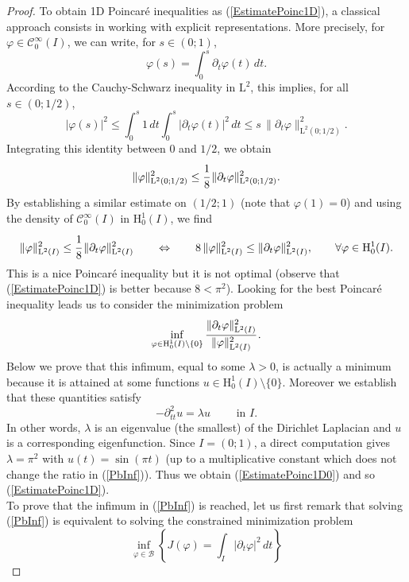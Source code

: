 \documentclass[11pt,a4paper]{report}
\newcommand{\mrm}[1]{\mathrm{#1}}
\newcommand{\mL}{\mrm{L}}
\newcommand{\mH}{\mrm{H}}
\begin{document}
\begin{proof}
To obtain 1D Poincar\'e inequalities as (\ref{EstimatePoinc1D}), a classical approach consists in working with explicit representations. More precisely, for $\varphi\in\mathscr{C}^\infty_0(I)$, we can write, for $s\in(0;1)$,
\[
\varphi(s)=\int_{0}^s \partial_t\varphi(t)\,dt.
\]
According to the Cauchy-Schwarz inequality in $\mL^2$, this implies, for all $s\in(0;1/2)$,
\[
|\varphi(s)|^2 \le \int_{0}^s1\,dt\int_{0}^s|\partial_t\varphi(t)|^2\,dt \le s\,\|\partial_t\varphi\|^2_{\mL^2(0;1/2)}.
\]
Integrating this identity between $0$ and $1/2$, we obtain
\[
\|\varphi\|^2_{\mL^2(0;1/2)}\le \cfrac{1}{8}\,\|\partial_t\varphi\|^2_{\mL^2(0;1/2)}.
\]
By establishing a similar estimate on $(1/2;1)$ (note that $\varphi(1)=0$) and using the density of $\mathscr{C}^\infty_0(I)$ in $\mH^1_0(I)$, we find 
\[
\|\varphi\|^2_{\mL^2(I)}\le \cfrac{1}{8}\,\|\partial_t\varphi\|^2_{\mL^2(I)}\qquad\Leftrightarrow\qquad 8\,\|\varphi\|^2_{\mL^2(I)}\le \|\partial_t\varphi\|^2_{\mL^2(I)},\qquad\forall\varphi\in\mH^1_0(I).
\]
This is a nice Poincar\'e inequality but it is not optimal (observe that (\ref{EstimatePoinc1D}) is better because $8<\pi^2$). Looking for the best Poincar\'e inequality leads us to consider the minimization problem 
\begin{equation}\label{PbInf}
\inf_{\varphi\in\mH^1_0(I)\setminus\{0\}} \cfrac{\|\partial_t\varphi\|^2_{\mL^2(I)}}{\|\varphi\|^2_{\mL^2(I)}}\,.
\end{equation}
Below we prove that this infimum, equal to some $\lambda>0$, is actually a minimum because it is attained at some functions $u\in\mH^1_0(I)\setminus\{0\}$. Moreover we establish that these quantities  satisfy
\begin{equation}\label{PbSpectral}
-\partial_{tt}^2u=\lambda u\qquad\mbox{ in }I.
\end{equation}
In other words, $\lambda$ is an eigenvalue (the smallest) of the Dirichlet Laplacian and $u$ is a corresponding eigenfunction. Since $I=(0;1)$, a direct computation gives $\lambda=\pi^2$ with $u(t)=\sin(\pi t)$ (up to a multiplicative constant which does not change the ratio in (\ref{PbInf})). Thus we obtain (\ref{EstimatePoinc1D0}) and so (\ref{EstimatePoinc1D}).\\
\newline
To prove that the infimum in (\ref{PbInf}) is reached, let us first remark that solving (\ref{PbInf}) is equivalent to solving the constrained minimization problem 
\[
\inf_{\varphi\in \mathscr{B}}\left\{ J(\varphi)=\int_{I}|\partial_t\varphi|^2\,dt\right\}
\]
\end{proof}
\end{document}
